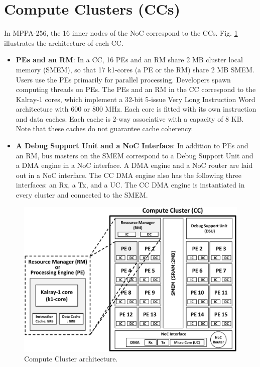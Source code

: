 \section{Compute Clusters (CCs)}
\label{sec:cc}
In MPPA-256, the 16 inner nodes of the NoC correspond to the CCs.
Fig. \ref{fig:cc_architecture} illustrates the architecture of each CC.

\begin{itemize}
  \setlength{\leftskip}{-5mm}    
  \item \textbf{PEs and an RM}:
  In a CC, 16 PEs and an RM share 2 MB cluster local memory (SMEM), so that 17 k1-cores (a PE or the RM) share 2 MB SMEM.
  Users use the PEs primarily for parallel processing.
  Developers spawn computing threads on PEs.
  The PEs and an RM in the CC correspond to the Kalray-1 cores, which implement a 32-bit 5-issue Very Long Instruction Word architecture with 600 or 800 MHz.
  Each core is fitted with its own instruction and data caches.
  Each cache is 2-way associative with a capacity of 8 KB.
  Note that these caches do not guarantee cache coherency.
  
  \item \textbf{A Debug Support Unit and a NoC Interface}:
  In addition to PEs and an RM, bus masters on the SMEM correspond to a Debug Support Unit and a DMA engine in a NoC interface.
  A DMA engine and a NoC router are laid out in a NoC interface.
  The CC DMA engine also has the following three interfaces: an Rx, a Tx, and a UC. 
  The CC DMA engine is instantiated in every cluster and connected to the SMEM.
\end{itemize}
\begin{figure}[!htbp]
  \centering
  \includegraphics[width=0.7\linewidth]{../figure/cc_architecture.eps}
  \caption{\label{fig:cc_architecture}
    Compute Cluster architecture.}
\end{figure}

